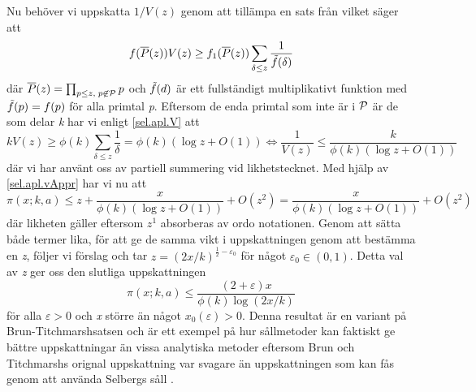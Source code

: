 Nu behöver vi uppskatta \(1/V(z)\) genom att tillämpa en sats från \cite[Kap. 7]{cojocarumurty} vilket säger att
\begin{equation}
    f(\overline{P}(z))V(z) \geq f_1(\overline{P}(z))\sum_{\delta \leq z}\frac{1}{\Tilde{f}(\delta)}\label{sel.apl.V}
\end{equation}
där \(\overline{P}(z) = \prod_{p\leq z,\; p \not \in \P}p\) och \(\Tilde{f}(d)\) är ett fullständigt multiplikativt funktion med \(\Tilde{f}(p) = f(p)\) för alla primtal \textit{p}. 
Eftersom de enda primtal som inte är i \(\P\) är de som delar \textit{k} har vi enligt \eqref{sel.apl.V} att 
\begin{equation}
    kV(z) \geq \phi(k) \sum_{\delta \leq z}\frac{1}{\delta} = \phi(k)(\log z + O(1)) \iff \frac{1}{V(z)} \leq \frac{k}{\phi(k)(\log z + O(1))}\label{sel.apl.vAppr}
\end{equation}
där vi har använt oss av partiell summering vid likhetstecknet. 
Med hjälp av \eqref{sel.apl.vAppr} har vi nu att
\begin{equation}
     \pi(x;k,a) \leq z + \frac{x}{\phi(k)(\log z + O(1))} + O(z^2) = \frac{x}{\phi(k)(\log z + O(1))} + O(z^2)\nonumber
\end{equation}
där likheten gäller eftersom \(z^1\) absorberas av ordo notationen. 
Genom att sätta både termer lika, för att ge de samma vikt i uppskattningen genom att bestämma en \textit{z}, följer vi \cite{cojocarumurty} förslag och tar \(z = (2x/k)^{\frac{1}{2}-\varepsilon_0}\) för något \(\varepsilon_0\in(0, 1)\). Detta val av \textit{z} ger oss den slutliga uppskattningen
\begin{equation}
    \pi(x;k,a) \leq \frac{(2+\varepsilon)x}{\phi(k)\log(2x/k)}\nonumber
\end{equation}
för alla \(\varepsilon > 0\) och \textit{x} större än något \(x_0(\varepsilon) >0\). 
Denna resultat är en variant på Brun-Titchmarshsatsen och är ett exempel på hur sållmetoder kan faktiskt ge bättre uppskattningar än vissa analytiska metoder eftersom Brun och Titchmarshs orignal uppskattning var svagare än uppskattningen som kan fås genom att använda Selbergs såll \cite{BrunTitch}.